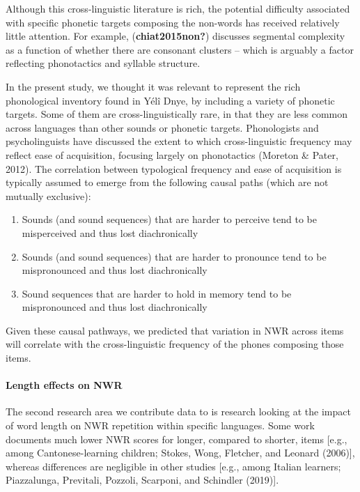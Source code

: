 \documentclass[
  english,
  ,man,floatsintext]{apa6}
\providecommand{\tightlist}{%
  \setlength{\itemsep}{0pt}\setlength{\parskip}{0pt}}
\let\oldparagraph\paragraph
\renewcommand{\paragraph}[1]{\oldparagraph{#1}\mbox{}}
\begin{document}
Although this cross-linguistic literature is rich, the potential difficulty associated with specific phonetic targets composing the non-words has received relatively little attention. For example, (\textbf{chiat2015non?}) discusses segmental complexity as a function of whether there are consonant clusters -- which is arguably a factor reflecting phonotactics and syllable structure.

In the present study, we thought it was relevant to represent the rich phonological inventory found in Yélî Dnye, by including a variety of phonetic targets. Some of them are cross-linguistically rare, in that they are less common across languages than other sounds or phonetic targets. Phonologists and psycholinguists have discussed the extent to which cross-linguistic frequency may reflect ease of acquisition, focusing largely on phonotactics (Moreton \& Pater, 2012). The correlation between typological frequency and ease of acquisition is typically assumed to emerge from the following causal paths (which are not mutually exclusive):

\begin{enumerate}
\def\labelenumi{\arabic{enumi}.}
\tightlist
\item
  Sounds (and sound sequences) that are harder to perceive tend to be misperceived and thus lost diachronically
\item
  Sounds (and sound sequences) that are harder to pronounce tend to be mispronounced and thus lost diachronically
\item
  Sound sequences that are harder to hold in memory tend to be mispronounced and thus lost diachronically
\end{enumerate}

Given these causal pathways, we predicted that variation in NWR across items will correlate with the cross-linguistic frequency of the phones composing those items.

\hypertarget{length-effects-on-nwr}{%
\paragraph{Length effects on NWR}\label{length-effects-on-nwr}}

The second research area we contribute data to is research looking at the impact of word length on NWR repetition within specific languages. Some work documents much lower NWR scores for longer, compared to shorter, items {[}e.g., among Cantonese-learning children; Stokes, Wong, Fletcher, and Leonard (2006){]}, whereas differences are negligible in other studies {[}e.g., among Italian learners; Piazzalunga, Previtali, Pozzoli, Scarponi, and Schindler (2019){]}.
\end{document}
